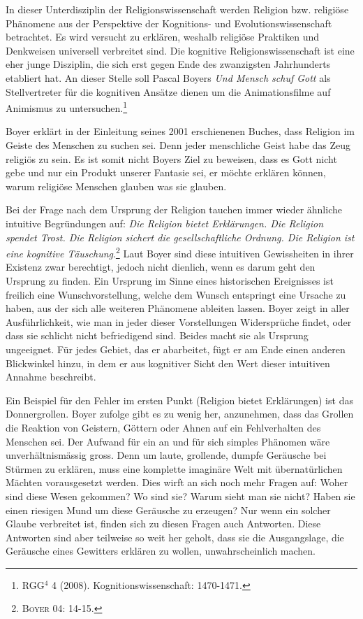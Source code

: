 In dieser Unterdisziplin der Religionswissenschaft werden Religion bzw. religiöse Phänomene aus der Perspektive der Kognitions- und Evolutionswissenschaft betrachtet. Es wird versucht zu erklären, weshalb religiöse Praktiken und Denkweisen universell verbreitet sind. Die kognitive Religionswissenschaft ist eine eher junge Disziplin, die sich erst gegen Ende des zwanzigsten Jahrhunderts etabliert hat. An dieser Stelle soll Pascal Boyers \emph{Und Mensch schuf Gott} als Stellvertreter für die kognitiven Ansätze dienen um die Animationsfilme auf Animismus zu untersuchen.\footnote{RGG$^4$ 4 (2008). Kognitionswissenschaft: 1470-1471.}

Boyer erklärt in der Einleitung seines 2001 erschienenen Buches, dass Religion im Geiste des Menschen zu suchen sei. Denn jeder menschliche Geist habe das Zeug religiös zu sein. Es ist somit nicht Boyers Ziel zu beweisen, dass es Gott nicht gebe und nur ein Produkt unserer Fantasie sei, er möchte erklären können, warum religiöse Menschen glauben was sie glauben.

Bei der Frage nach dem Ursprung der Religion tauchen immer wieder ähnliche intuitive Begründungen auf: \emph{Die Religion bietet Erklärungen. Die Religion spendet Trost. Die Religion sichert die gesellschaftliche Ordnung. Die Religion ist eine kognitive Täuschung}.\footnote{\textsc{Boyer 04: 14-15.}} Laut Boyer sind diese intuitiven Gewissheiten in ihrer Existenz zwar berechtigt, jedoch nicht dienlich, wenn es darum geht den Ursprung zu finden. Ein Ursprung im Sinne eines historischen Ereignisses ist freilich eine Wunschvorstellung, welche dem Wunsch entspringt eine Ursache zu haben, aus der sich alle weiteren Phänomene ableiten lassen. Boyer zeigt in aller Ausführlichkeit, wie man in jeder dieser Vorstellungen Widersprüche findet, oder dass sie schlicht nicht befriedigend sind. Beides macht sie als Ursprung ungeeignet. Für jedes Gebiet, das er abarbeitet, fügt er am Ende einen anderen Blickwinkel hinzu, in dem er aus kognitiver Sicht den Wert dieser intuitiven Annahme beschreibt.

Ein Beispiel für den Fehler im ersten Punkt (Religion bietet Erklärungen) ist das Donnergrollen. Boyer zufolge gibt es zu wenig her, anzunehmen, dass das Grollen die Reaktion von Geistern, Göttern oder Ahnen auf ein Fehlverhalten des Menschen sei. Der Aufwand für ein an und für sich simples Phänomen wäre unverhältnismässig gross. Denn um laute, grollende, dumpfe Geräusche bei Stürmen zu erklären, muss eine komplette imaginäre Welt mit übernatürlichen Mächten vorausgesetzt werden. Dies wirft an sich noch mehr Fragen auf: Woher sind diese Wesen gekommen? Wo sind sie? Warum sieht man sie nicht? Haben sie einen riesigen Mund um diese Geräusche zu erzeugen? Nur wenn ein solcher Glaube verbreitet ist, finden sich zu diesen Fragen auch Antworten. Diese Antworten sind aber teilweise so weit her geholt, dass sie die Ausgangslage, die Geräusche eines Gewitters erklären zu wollen, unwahrscheinlich machen. 

